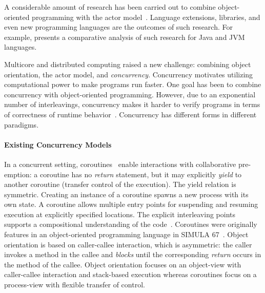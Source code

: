 A considerable amount of research has been carried out to combine object-oriented programming with the actor model~\cite{philippsen2000survey}. 
Language extensions, libraries, and even new programming languages are the  outcomes of such research.
For example, \cite{actor_frameworks_jvm:agha} presents a comparative analysis of such research for Java and JVM languages.

Multicore and distributed computing raised a new challenge: combining object orientation, the actor model, and \emph{concurrency}.
Concurrency motivates utilizing computational power to make programs run faster.
One goal has been to combine concurrency with object-oriented programming.
However, due to an exponential number of interleavings, concurrency makes it harder to verify programs in terms of correctness of runtime behavior~\cite{Herlihy:1990:linear,johnsen:history,agha:predictive:safety}. 
Concurrency has different forms in different paradigms.

\paragraph*{Existing Concurrency Models}
In a concurrent setting, coroutines~\cite{conway1963design,taocp:knuth} enable interactions with collaborative pre-emption:
a coroutine has no \emph{return} statement, but it may explicitly \emph{yield}
to another coroutine (transfer control of the execution).
The yield relation is symmetric. 
Creating an instance of a coroutine spawns a new process with its own state.
A coroutine allows multiple entry points for suspending and resuming execution at explicitly specified locations.
The explicit interleaving points supports a compositional understanding of the code~\cite{DBLP:journals/cacm/Hoare74}.
Coroutines were originally features in an object-oriented programming language in SIMULA 67~\cite{Dahl:1968:simula}.
Object orientation is based on caller-callee interaction, which is asymmetric:
the caller invokes a method in the callee and \emph{blocks} until the
corresponding \emph{return} occurs in the method of the callee.
Object orientation focuses on an object-view with caller-callee interaction and stack-based execution whereas coroutines focus on a process-view with flexible transfer of control.


